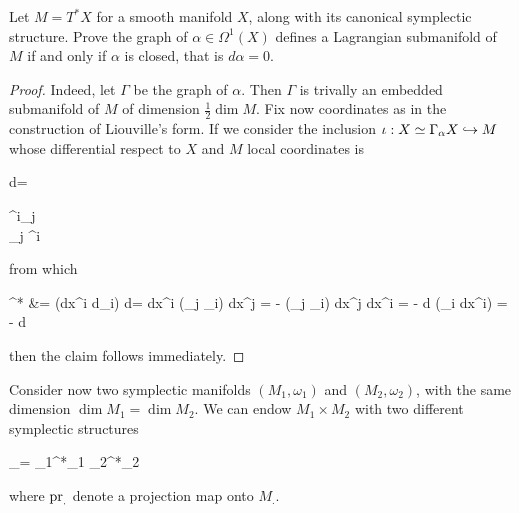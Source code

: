\documentclass[main.tex]{subfiles}
\begin{document}
\begin{exercise}
\label{ex:lagrangian_submanifolds_of_cotangent_bundles}
	Let $M = T^*X$ for a smooth manifold $X$, along with its canonical symplectic structure. Prove the graph of $\alpha \in \Omega^1(X)$ defines a Lagrangian submanifold of $M$ if and only if $\alpha$ is closed, that is $d\alpha =0$.
\end{exercise}
\begin{proof}
	Indeed, let $\Gamma$ be the graph of $\alpha$. Then $\Gamma$ is trivally an embedded submanifold of $M$ of dimension $\frac12 \dim M$. Fix now coordinates as in the construction of Liouville's form. If we consider the inclusion $\iota : X \simeq \Gamma_\alpha X \hookrightarrow M$ whose differential respect to $X$ and $M$ local coordinates is 
	\begin{eqalign}
		d\iota = \begin{pmatrix}
			\delta^i_j \\
			\partial_j \alpha^i
		\end{pmatrix}
	\end{eqalign}
	from which
	\begin{eqalign}
		\iota^* \omega &= (dx^i \wedge d\xi_i) \circ d\iota = dx^i \wedge (\partial_j \alpha_i) dx^j = - (\partial_j \alpha_i) dx^j \wedge dx^i = - d (\alpha_i dx^i) = - d\alpha
	\end{eqalign}
	then the claim follows immediately.
\end{proof}

Consider now two symplectic manifolds $(M_1,\omega_1)$ and $(M_2, \omega_2)$, with the same dimension $\dim M_1 = \dim M_2$. We can endow $M_1 \times M_2$ with two different symplectic structures
\begin{eqalign}
	\omega_\pm = \pr_1^*\omega_1 \pm \pr_2^*\omega_2
\end{eqalign}
where $\mathrm{pr}_.$ denote a projection map onto $M_.$.
\end{document}
